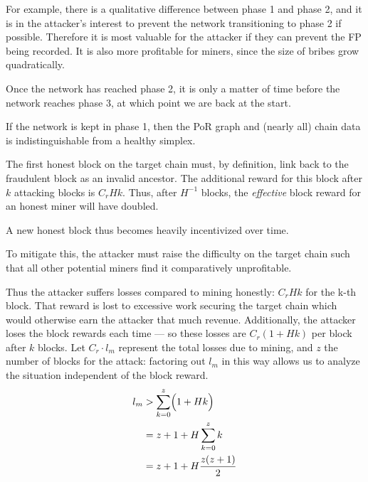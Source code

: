 For example, there is a qualitative difference between phase 1 and phase 2, and it is in the attacker's interest to prevent the network transitioning to phase 2 if possible.
Therefore it is most valuable for the attacker if they can prevent the FP being recorded.
It is also more profitable for miners, since the size of bribes grow quadratically.

Once the network has reached phase 2, it is only a matter of time before the network reaches phase 3, at which point we are back at the start.

If the network is kept in phase 1, then the PoR graph and (nearly all) chain data is indistinguishable from a healthy simplex.




The first honest block on the target chain must, by definition, link back to the fraudulent block as an invalid ancestor.
The additional reward for this block after $k$ attacking blocks is $C_r H k$.
Thus, after $H^{-1}$ blocks, the \emph{effective} block reward for an honest miner will have doubled.

A new honest block thus becomes heavily incentivized over time.

To mitigate this, the attacker must raise the difficulty on the target chain such that all other potential miners find it comparatively unprofitable.

Thus the attacker suffers losses compared to mining honestly: $C_r H k$ for the k-th block.
That reward is lost to excessive work securing the target chain which would otherwise earn the attacker that much revenue.
Additionally, the attacker loses the block rewards each time --- so these losses are $C_r (1 + H k)$ per block after $k$ blocks.
Let $C_r \cdot l_m$ represent the total losses due to mining, and $z$ the number of blocks for the attack: factoring out $l_m$ in this way allows us to analyze the situation independent of the block reward.
\begin{align}
    l_m &> \sum\limits_{k=0}^z \Bigl( 1 + H k \Bigr) \nonumber \\
    &= z + 1 + H \sum\limits_{k=0}^z k \nonumber \\
    &= z + 1 + H \frac{z (z + 1)}{2}
    \label{eq:spv-atk-losses-mining}
\end{align}

